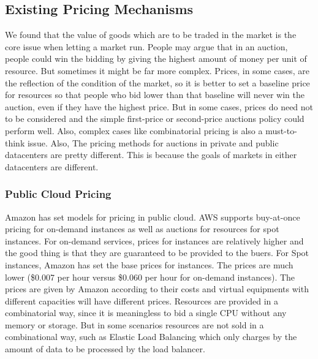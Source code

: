 \documentclass[a4paper,11pt,twocolumn]{article}
\begin{document}
\subsection{Existing Pricing Mechanisms}
We found that the value of goods which are to be traded in the market is the core issue when letting a market run. People may argue that in an auction,
people could win the bidding by giving the highest amount of money per unit of resource. But sometimes it might be far more complex. Prices, in some cases,
are the reflection of the condition of the market, so it is better to set a baseline price for resources so that people who bid lower than that baseline will
never win the auction, even if they have the highest price. But in some cases, prices do need not to be considered and the simple first-price or second-price auctions
policy could perform well. Also, complex cases like combinatorial pricing\cite{combinatorial auction} is also a must-to-think issue. Also, 
The pricing methods for auctions in private and public datacenters are pretty different. This is because the goals of markets in either datacenters are 
different. 
\subsubsection{Public Cloud Pricing}
Amazon\cite{aws} has set models for pricing in public cloud. AWS supports buy-at-once pricing for on-demand instances as well as auctions for resources
for spot instances. For on-demand services, prices for instances are relatively higher and the good thing is that they are guaranteed to be provided to the buers.
For Spot instances\cite{spot}, Amazon has set the base prices for instances. The prices are much lower (\$0.007 per hour versus \$0.060 per hour for on-demand instances).
The prices are given by Amazon according to their costs and virtual equipments with different capacities will have different prices. Resources
are provided in a combinatorial way, since it is meaningless to bid a single CPU without any memory or storage. But in some scenarios resources are not 
sold in a combinational way, such as Elastic Load Balancing which only charges by the amount of data to be processed by the load balancer.
\end{document}
